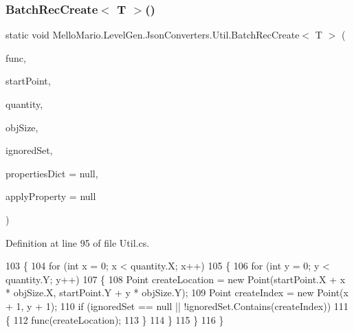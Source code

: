 \subsubsection{Batch\+Rec\+Create$<$ T $>$()}
{\footnotesize\ttfamily static void Mello\+Mario.\+Level\+Gen.\+Json\+Converters.\+Util.\+Batch\+Rec\+Create$<$ T $>$ (\begin{DoxyParamCaption}\item[{Func$<$ Point, T $>$}]{func,  }\item[{Point}]{start\+Point,  }\item[{Point}]{quantity,  }\item[{Point}]{obj\+Size,  }\item[{I\+Collection$<$ Point $>$}]{ignored\+Set,  }\item[{I\+Dictionary$<$ Point, T $>$}]{properties\+Dict = {\ttfamily null},  }\item[{\textbf{ Action}$<$ Point, T $>$}]{apply\+Property = {\ttfamily null} }\end{DoxyParamCaption})\hspace{0.3cm}{\ttfamily [static]}}



Definition at line 95 of file Util.\+cs.


\begin{DoxyCode}
103         \{
104             \textcolor{keywordflow}{for} (\textcolor{keywordtype}{int} x = 0; x < quantity.X; x++)
105             \{
106                 \textcolor{keywordflow}{for} (\textcolor{keywordtype}{int} y = 0; y < quantity.Y; y++)
107                 \{
108                     Point createLocation = \textcolor{keyword}{new} Point(startPoint.X + x * objSize.X, startPoint.Y + y * 
      objSize.Y);
109                     Point createIndex = \textcolor{keyword}{new} Point(x + 1, y + 1);
110                     \textcolor{keywordflow}{if} (ignoredSet == null || !ignoredSet.Contains(createIndex))
111                     \{
112                         func(createLocation);
113                     \}
114                 \}
115             \}
116         \}
\end{DoxyCode}
\mbox{\label{classMelloMario_1_1LevelGen_1_1JsonConverters_1_1Util_adbe5c344a018dbcfcae283f66bc24b55}} 
